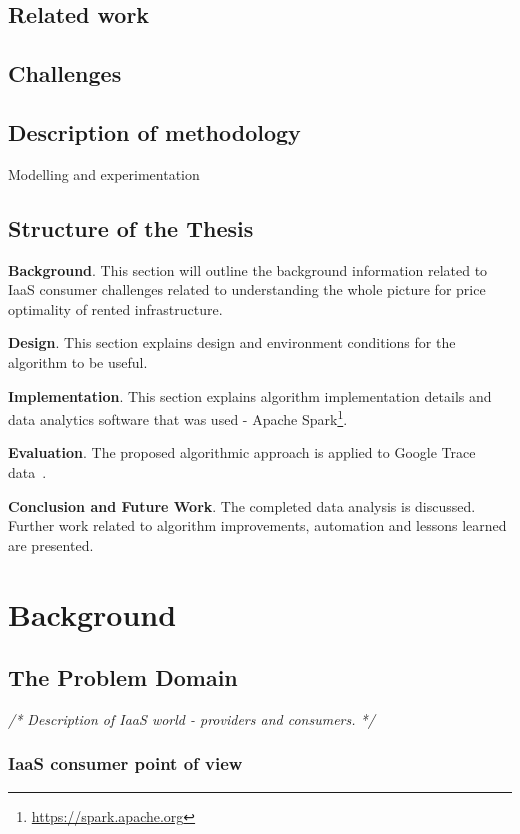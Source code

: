 \documentclass[]{final_report}
\begin{document}
\section{Related work}




\section{Challenges}

\section{Description of methodology}
Modelling and experimentation

\section{Structure of the Thesis}
\textbf{Background}. This section will outline the background information related to IaaS consumer challenges related to understanding the whole picture for price optimality of rented infrastructure. \par
\textbf{Design}. This section explains design and environment conditions for the algorithm to be useful. \par
\textbf{Implementation}. This section explains algorithm implementation details and data analytics software that was used - Apache Spark\footnote{\url{https://spark.apache.org}}. \par
\textbf{Evaluation}. The proposed algorithmic approach is applied to Google Trace data~\cite{clusterdata:Reiss2011}. \par
\textbf{Conclusion and Future Work}. The completed data analysis is discussed. Further work related to algorithm improvements, automation and lessons learned are presented. 
 
\newpage


\chapter{Background}

\section{The Problem Domain}
\emph{/* Description of IaaS world - providers and consumers. */}
\subsection{IaaS consumer point of view}
\end{document}

